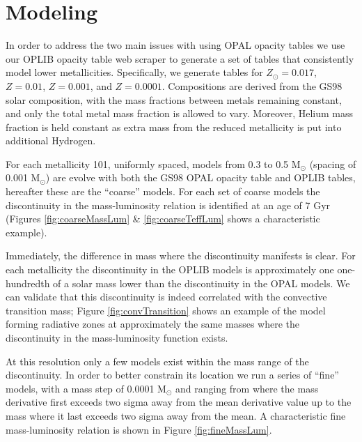 \section{Modeling}\label{sec:modeling}
In order to address the two main issues with using OPAL opacity tables we use
our OPLIB opacity table web scraper to generate a set of tables that
consistently model lower metallicities. Specifically, we generate tables for
$Z_{\odot}=0.017$, $Z=0.01$, $Z=0.001$, and $Z=0.0001$. Compositions are
derived from the GS98 solar composition, with the mass fractions between metals
remaining constant, and only the total metal mass fraction is allowed to vary.
Moreover, Helium mass fraction is held constant as extra mass from the reduced
metallicity is put into additional Hydrogen. 

For each metallicity 101, uniformly spaced, models from 0.3 to 0.5 M$_{\odot}$
(spacing of 0.001 M$_{\odot}$) are evolve with both the GS98 OPAL opacity table
and OPLIB tables, hereafter these are the ``coarse'' models. For each set of
coarse models the discontinuity in the mass-luminosity relation is identified
at an age of 7 Gyr (Figures \ref{fig:coarseMassLum} \& \ref{fig:coarseTeffLum}
shows a characteristic example).

Immediately, the difference in mass where the discontinuity manifests is clear.
For each metallicity the discontinuity in the OPLIB models is approximately one
one-hundredth of a solar mass lower than the discontinuity in the OPAL models. We can
validate that this discontinuity is indeed correlated with the convective
transition mass; Figure \ref{fig:convTransition} shows an example of the model
forming radiative zones at approximately the same masses where the discontinuity
in the mass-luminosity function exists.

At this resolution only a few models exist within the
mass range of the discontinuity. In order to better constrain its location we
run a series of ``fine'' models, with a mass step of 0.0001 M$_{\odot}$ and
ranging from where the mass derivative first exceeds two sigma away from the
mean derivative value up to the mass where it last exceeds two sigma away from
the mean. A characteristic fine mass-luminosity relation is shown in Figure
\ref{fig:fineMassLum}.


